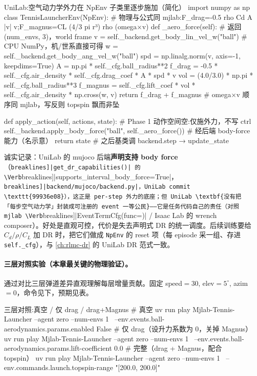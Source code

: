 \begin{codebox}[Python]{UniLab:空气动力学外力在 NpEnv 子类里逐步施加（简化）}
import numpy as np
class TennisLauncherEnv(NpEnv):
    # 物理与公式同 mjlab:F_drag=-0.5 rho Cd A |v| v;F_magnus=CL (4/3 pi r³) rho (omega×v)
    def _aero_force(self):                     # 返回 (num_envs, 3)，world frame
        v   = self._backend.get_body_lin_vel_w("ball")    # CPU NumPy，机/世系直接可得
        w   = self._backend.get_body_ang_vel_w("ball")
        spd = np.linalg.norm(v, axis=-1, keepdims=True)
        A   = np.pi * self._cfg.ball_radius**2
        f_drag   = -0.5 * self._cfg.air_density * self._cfg.drag_coef * A * spd * v
        vol      = (4.0/3.0) * np.pi * self._cfg.ball_radius**3
        f_magnus = self._cfg.lift_coef * vol * self._cfg.air_density * np.cross(w, v)
        return f_drag + f_magnus               # omega×v 顺序同 mjlab，写反则 topspin 飘而非坠

    def apply_action(self, actions, state):    # Phase 1 动作空间空:仅施外力，不写 ctrl
        self._backend.apply_body_force("ball", self._aero_force())  # 经后端 body-force 能力（名示意）
        return state                           # 之后基类调 backend.step → update_state
\end{codebox}

诚实记录：UniLab 的 mujoco 后端\textbf{声明支持 body force}（\Verb[breaklines]|get_dr_capabilities()| 的 \Verb[breaklines]|supports_interval_body_force=True|，\Verb[breaklines]|backend/mujoco/backend.py|，UniLab commit \texttt{99936e08}），这正是 per-step 外力的底座；但 UniLab \textbf{没有把「每步空气动力学」封装成可注册的 event 一等公民}——它是任务代码自己的责任（对照 mjlab \Verb[breaklines]|EventTermCfg(func=)| / Isaac Lab 的 wrench composer）。好处是直观可控，代价是失去声明式 DR 的统一调度。后续训练要给 $C_d/\rho/C_L$ 加 DR 时，把它们做成 \verb|NpEnv| 的 reset 项（每 episode 采一组、存进 \verb|self._cfg|），与 \cref{ch:rlmc-dr} 的 UniLab DR 范式一致。

\paragraph{三层对照实验（本章最关键的物理验证）。}通过对比三层弹道差异直观理解每层增量贡献。固定 speed$=30$, elev$=5^\circ$, azim$=0$，命令见下，预期见表。

\begin{codebox}[bash]{三层对照:真空 / 仅 drag / drag+Magnus}
# 真空
uv run play Mjlab-Tennis-Launcher --agent zero --num-envs 1 \
  --env.events.ball-aerodynamics.params.enabled False
# 仅 drag（设升力系数为 0，关掉 Magnus）
uv run play Mjlab-Tennis-Launcher --agent zero --num-envs 1 \
  --env.events.ball-aerodynamics.params.lift-coefficient 0.0
# 完整（drag + Magnus，配合 topspin）
uv run play Mjlab-Tennis-Launcher --agent zero --num-envs 1 \
  --env.commands.launch.topspin-range "[200.0, 200.0]"
\end{codebox}

